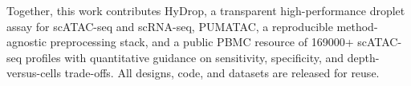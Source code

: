 Together, this work contributes HyDrop, a transparent high-performance droplet assay for scATAC-seq and scRNA-seq, PUMATAC, a reproducible method-agnostic preprocessing stack, and a public PBMC resource of \num{169000}+ scATAC-seq profiles with quantitative guidance on sensitivity, specificity, and depth-versus-cells trade-offs. All designs, code, and datasets are released for reuse.